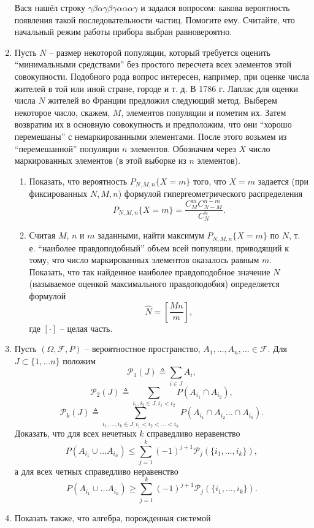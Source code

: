 \documentclass[a4paper, 14pt]{extarticle}
\begin{document}
\begin{enumerate}
Вася нашёл строку $\gamma \beta \alpha \gamma \beta \gamma \alpha \alpha \alpha \gamma$ и задался вопросом: какова вероятность появления такой последовательности частиц. Помогите ему. Считайте, что начальный режим работы прибора выбран равновероятно.
	\item Пусть $N$ -- размер некоторой популяции, который требуется 
	оценить ``минимальными средствами'' без простого пересчета всех элементов
	этой совокупности. Подобного рода вопрос интересен, например, при 
	оценке числа жителей в той или иной стране, городе и т. д.
	В 1786 г. Лаплас для оценки числа $N$ жителей во Франции предложил
	следующий метод.
	Выберем некоторое число, скажем, $M$, элементов популяции и пометим
	их. Затем возвратим их в основную совокупность и предположим, что
	они ``хорошо перемешаны'' с немаркированными элементами. После этого
	возьмем из ``перемешанной'' популяции $n$ элементов. Обозначим через $X$
	число маркированных элементов (в этой выборке из $n$ элементов).
	\begin{enumerate}
		\item Показать, что вероятность $P_{N,M,n}\{X = m\}$ того, что $X=m$ задается
		(при фиксированных $N,M,n$) формулой гипергеометрического 
		распределения
		$$P_{N,M,n}\{X = m\}=\frac{C_{M}^mC_{N-M}^{n-m}}{C_N^n}. $$
		\item Считая $M$, $n$ и $m$ заданными, найти максимум $P_{N,M,n}\{X = m\}$ по $N$,
		т. е. ``наиболее правдоподобный'' объем всей популяции, приводящий к
		тому, что число маркированных элементов оказалось равным $m$.
		Показать, что так найденное наиболее правдоподобное значение $N$ 
		(называемое оценкой максимального правдоподобия) определяется 
		формулой $$\widehat{N}=\left[\frac{Mn}{m}\right], $$
		где $[\cdot]$ -- целая часть.
	\end{enumerate}
		\item Пусть $(\Omega,\mathcal{F},P)$ -- вероятностное пространство, $A_1,\ldots, A_n,\ldots\in\mathcal{F}$. Для $J\subset \{1,\ldots n\}$ положим
	$$\mathcal{P}_1(J)\triangleq \sum_{i\in J}A_i, $$
	$$\mathcal{P}_{2}(J)\triangleq \sum_{i_1,i_2\in J,i_1<i_2}P(A_{i_1}\cap A_{i_2}), $$
	$$\mathcal{P}_k(J)\triangleq \sum_{i_1,\ldots,i_k\in J,i_1<i_2<\ldots<i_k}P(A_{i_1}\cap A_{i_2} \ldots\cap A_{i_k}). $$ Доказать, что для всех нечетных $k$ справедливо неравенство
	$$P(A_{i_1}\cup\ldots A_{i_n})\leq \sum_{j=1}^k(-1)^{j+1}\mathcal{P}_j(\{i_1,\ldots,i_k\}), $$ а для всех четных справедливо неравенство
	$$P(A_{i_1}\cup\ldots A_{i_n})\geq \sum_{j=1}^k(-1)^{j+1}\mathcal{P}_j(\{i_1,\ldots,i_k\}). $$ 	\item Показать также, что алгебра, порожденная системой

\end{enumerate}
\end{document}
